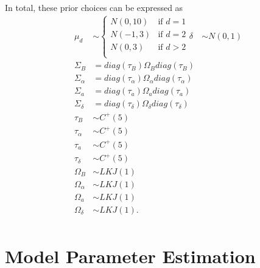 \documentclass[12pt,letterpaper]{article}
\begin{document}
In total, these prior choices can be expressed as
\begin{equation}
  \begin{aligned}
    \mu_{d} &\sim 
      \begin{cases}
        N(0, 10) & \text{if } d = 1 \\
        N(-1, 3) & \text{if } d = 2 \\
        N(0, 3) & \text{if } d > 2 \\
      \end{cases}
    \delta &\sim N(0, 1) \\
    \Sigma_{B} &= diag(\tau_{B}) \Omega_{B} diag(\tau_{B}) \\
    \Sigma_{\alpha} &= diag(\tau_{\alpha}) \Omega_{\alpha} diag(\tau_{\alpha}) \\
    \Sigma_{a} &= diag(\tau_{a}) \Omega_{a} diag(\tau_{a}) \\
    \Sigma_{\delta} &= diag(\tau_{\delta}) \Omega_{\delta} diag(\tau_{\delta}) \\
    \tau_{B} &\sim C^{+}(5) \\
    \tau_{\alpha} &\sim C^{+}(5) \\
    \tau_{a} &\sim C^{+}(5) \\
    \tau_{\delta} &\sim C^{+}(5) \\
    \Omega_{B} &\sim LKJ(1) \\
    \Omega_{\alpha} &\sim LKJ(1) \\
    \Omega_{a} &\sim LKJ(1) \\
    \Omega_{\delta} &\sim LKJ(1). \\
  \end{aligned}
  \label{eq:priors}
\end{equation}


\section{Model Parameter Estimation}
\end{document}
